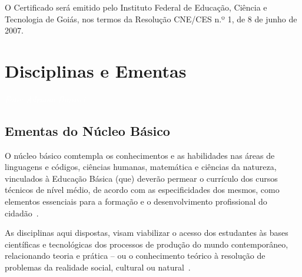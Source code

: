 \documentclass[11pt,fleqn]{book} %
\begin{document}
O Certificado será emitido pelo Instituto Federal de Educação, Ciência e Tecnologia de Goiás, nos termos da Resolução CNE/CES n.º 1, de 8 de junho de 2007.	

\chapter{Disciplinas e Ementas}
\vspace{6em}
\begin{flushright}
	\textit{\textcolor{white}{Foto: Adriano Darosci}}
\end{flushright}
\vspace{12em}

\section{Ementas do Núcleo Básico}\label{ementasBasico}
\indent

O núcleo básico comtempla os conhecimentos e as habilidades nas áreas de linguagens e códigos, ciências humanas, matemática e ciências da natureza, vinculados à Educação Básica (que) deverão permear o currículo dos cursos técnicos de nível médio, de acordo com as especificidades dos mesmos, como elementos essenciais para a formação e o desenvolvimento profissional do cidadão~\cite{Resolucao06De2012}.

As disciplinas aqui dispostas, visam viabilizar o acesso dos estudantes às bases científicas e tecnológicas dos processos de produção do mundo contemporâneo, relacionando teoria e prática – ou o conhecimento teórico à resolução de problemas da realidade social, cultural ou natural~\cite{BNCC2019}.


\newpage
\end{document}
